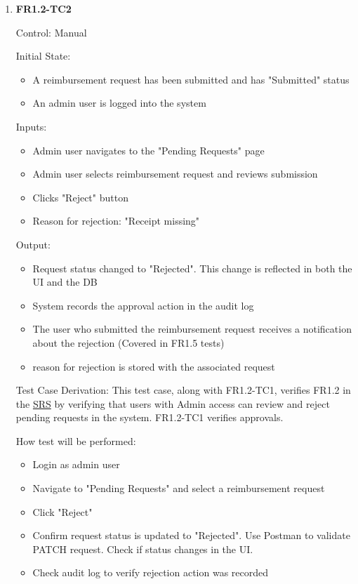 \documentclass[12pt, titlepage]{article}
\begin{document}
\begin{enumerate}
    \item{\textbf{FR1.2-TC2}}
    \hypertarget{FR1.2-TC2}{}
    
    Control: Manual
    
    Initial State:
    \begin{itemize}
        \item A reimbursement request has been submitted and has "Submitted" status
        \item An admin user is logged into the system
    \end{itemize}
    
    Inputs: 
    \begin{itemize}
        \item Admin user navigates to the "Pending Requests" page
        \item Admin user selects reimbursement request and reviews submission
        \item Clicks "Reject" button
        \item Reason for rejection: "Receipt missing"
    \end{itemize}
    
    Output: 
    \begin{itemize}
        \item Request status changed to "Rejected". This change is reflected in both the UI and the DB
        \item System records the approval action in the audit log
        \item The user who submitted the reimbursement request receives a notification about the rejection (Covered in FR1.5 tests)
        \item reason for rejection is stored with the associated request
    \end{itemize}
    
    Test Case Derivation: This test case, along with FR1.2-TC1, verifies FR1.2 in the \href{https://shorturl.at/FdAgR}{SRS} by verifying that users with Admin access can review and reject pending requests in the system. FR1.2-TC1 verifies approvals.
    
    How test will be performed:
    \begin{itemize}
        \item Login as admin user
        \item Navigate to "Pending Requests" and select a reimbursement request
        \item Click "Reject"
        \item Confirm request status is updated to "Rejected". Use Postman to validate PATCH request. Check if status changes in the UI.
        \item Check audit log to verify rejection action was recorded
    \end{itemize}
\end{enumerate}
\end{document}
